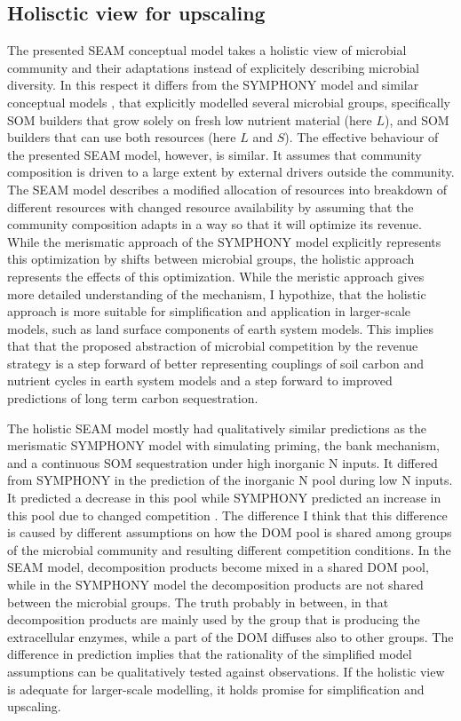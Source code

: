 \subsection{Holisctic view for upscaling
\label{sec:Holistic}} 

The presented SEAM conceptual model takes a holistic view \citep{Panikov10}
of microbial community and their adaptations instead of explicitely
describing microbial diversity.
In this respect it differs from the SYMPHONY model \citep{Perveen14} and similar conceptual
models \citep{Fontaine03}, that explicitly modelled several microbial groups,
specifically SOM builders that grow solely on fresh low nutrient material (here
$L$), and SOM builders that can use both resources (here $L$ and $S$). The
effective behaviour of the presented SEAM model, however, is similar. It assumes
that community composition is driven to a large extent by external drivers
outside the community. The SEAM model describes a modified allocation of
resources into breakdown of different resources with changed resource
availability by assuming that the community composition adapts in a way so that
it will optimize its revenue.
While the merismatic approach of the SYMPHONY model explicitly represents this
optimization by shifts between microbial groups, the holistic approach
represents the effects of this optimization.
While the meristic approach gives more detailed understanding of the mechanism,
I hypothize, that the holistic approach is more suitable for simplification
\citep{Wutzler13} and application in larger-scale models, such as land surface
components of earth system models.
This implies that that the proposed abstraction of microbial competition by the
revenue strategy is a step forward of better representing couplings of soil
carbon and nutrient cycles in earth system models and a step forward to improved
predictions of long term carbon sequestration.

The holistic SEAM model mostly had qualitatively similar predictions as the
merismatic SYMPHONY model with simulating priming, the bank mechanism, and a
continuous SOM sequestration under high inorganic N inputs. It differed from
SYMPHONY in the prediction of the inorganic N pool during low N inputs. It
predicted a decrease in this pool while SYMPHONY predicted an increase in this
pool due to changed competition \citep{Perveen14}. The difference I think that
this difference is caused by different assumptions on how the DOM pool is shared
among groups of the microbial community and resulting different competition
conditions. In the SEAM model, decomposition products become mixed in a shared
DOM pool, while in the SYMPHONY model the decomposition products are not shared
between the microbial groups.
The truth probably in between, in that decomposition products are mainly used by
the group that is producing the extracellular enzymes, while a part of the DOM
diffuses also to other groups.
The difference in prediction implies that the rationality of the simplified
model assumptions can be qualitatively tested against observations. If the
holistic view is adequate for larger-scale modelling, it holds promise for
simplification and upscaling.

